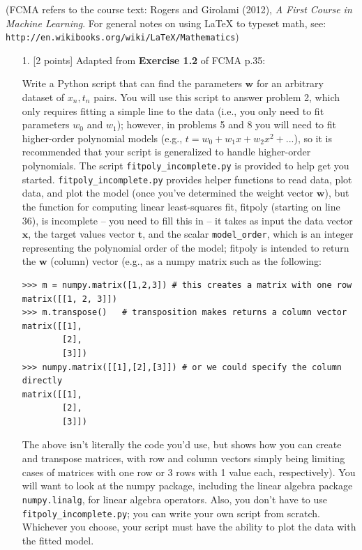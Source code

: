 \documentclass[10pt]{article}
\newcommand{\latex}{\LaTeX\xspace}
\begin{document}
(FCMA refers to the course text: Rogers and Girolami (2012), {\em A First Course in Machine Learning}.  For general notes on using \latex to typeset math, see: {\tt http://en.wikibooks.org/wiki/LaTeX/Mathematics})
\vspace{.5cm}


\newpage
\begin{itemize}

\item[1.] [2 points]
Adapted from {\bf Exercise 1.2} of FCMA p.35:

Write a Python script that can find the parameters $\mathbf{w}$ for an arbitrary dataset of $x_n, t_n$ pairs.  You will use this script to answer problem 2, which only requires fitting a simple line to the data (i.e., you only need to fit parameters $w_0$ and $w_1$); however, in problems 5 and 8 you will need to fit higher-order polynomial models (e.g., $t = w_0 + w_1x + w_2x^2 + ...$), so it is recommended that your script is generalized to handle higher-order polynomials.  The script {\tt fitpoly\_incomplete.py} is provided to help get you started.  {\tt fitpoly\_incomplete.py} provides helper functions to read data, plot data, and plot the model (once you've determined the weight vector $\mathbf{w}$), but the function for computing linear least-squares fit, fitpoly (starting on line 36), is incomplete -- you need to fill this in -- it takes as input the data vector $\mathbf{x}$, the target values vector $\mathbf{t}$, and the scalar {\tt model\_order}, which is an integer representing the polynomial order of the model; fitpoly is intended to return the $\mathbf{w}$ (column) vector (e.g., as a numpy matrix such as the following:
\begin{verbatim}
>>> m = numpy.matrix([1,2,3]) # this creates a matrix with one row
matrix([[1, 2, 3]]) 
>>> m.transpose()   # transposition makes returns a column vector
matrix([[1],
        [2],
        [3]])
>>> numpy.matrix([[1],[2],[3]]) # or we could specify the column directly
matrix([[1],
        [2],
        [3]])
\end{verbatim}
The above isn't literally the code you'd use, but shows how you can create and transpose matrices, with row and column vectors simply being limiting cases of matrices with one row or 3 rows with 1 value each, respectively).  You will want to look at the numpy package, including the linear algebra package {\tt numpy.linalg}, for linear algebra operators.  Also, you don't have to use {\tt fitpoly\_incomplete.py}; you can write your own script from scratch.  Whichever you choose, your script must have the ability to plot the data with the fitted model.


\end{itemize}
\end{document}
